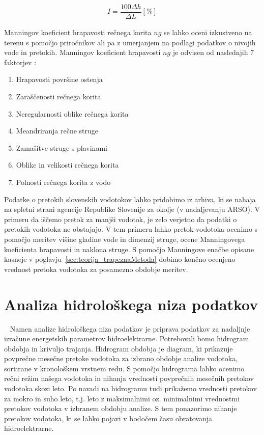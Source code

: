 \begin{ceqn}
\begin{align}
 I = \dfrac{100\Delta h}{\Delta L} [\%]
\end{align}
\end{ceqn}


  Manningov koeficient hrapavosti rečnega korita $ng$ se lahko oceni izkustveno na terenu s pomočjo priročnikov ali pa z umerjanjem na podlagi podatkov o nivojih vode in pretokih. Manningov koeficient hrapavosti $ng$ je odvisen od naslednjih 7 faktorjev \cite{VenTeChow}:
 \begin{enumerate}[noitemsep, topsep=0pt]
 	\item Hrapavosti površine ostenja
 	\item Zaraščenosti rečnega korita
 	\item Neregularnosti oblike rečnega korita
 	\item Meandriranja rečne struge
 	\item Zamašitve struge s plavinami 
 	\item Oblike in velikosti rečnega korita
 	\item Polnosti rečnega korita z vodo
 \end{enumerate}
 

 
 
  Podatke o pretokih slovenskih vodotokov lahko pridobimo iz arhiva, ki se nahaja na spletni strani agencije Republike Slovenije za okolje (v nadaljevanju ARSO). V primeru da iščemo pretok za manjši vodotok, je zelo verjetno da podatki o pretokih vodotoka ne obstajajo. V tem primeru lahko pretok vodotoka ocenimo s pomočjo meritev višine gladine vode in dimenzij struge, ocene Manningovega koeficienta hrapavosti in naklona struge. S pomočjo Manningove enačbe opisane kasneje v poglavju~\ref{sec:teorija_trapeznaMetoda} dobimo končno ocenjeno vrednost pretoka vodotoka za posamezno obdobje meritev.




\section{Analiza hidrološkega niza podatkov}~\label{sec:teorija_hidrogramObdobja}
Namen analize hidrološkega niza podatkov je priprava podatkov za nadaljnje izračune energetskih parametrov hidroelektrarne. Potrebovali bomo hidrogram obdobja in krivuljo trajanja. Hidrogram obdobja je diagram, ki prikazuje povprečne mesečne pretoke vodotoka za izbrano obdobje analize vodotoka, sortirane v kronološkem vrstnem redu. S pomočjo hidrograma lahko ocenimo rečni režim našega vodotoka in nihanja vrednosti povprečnih mesečnih pretokov vodotoka skozi leto. Po navadi na hidrogramu tudi prikažemo vrednosti pretokov za mokro in suho leto, t.j. leto z maksimalnimi oz. minimalnimi vrednostmi pretokov vodotoka v izbranem obdobju analize. S tem ponazorimo nihanje pretokov vodotoka, ki se lahko pojavi v bodočem času obratovanja hidroelektrarne.


